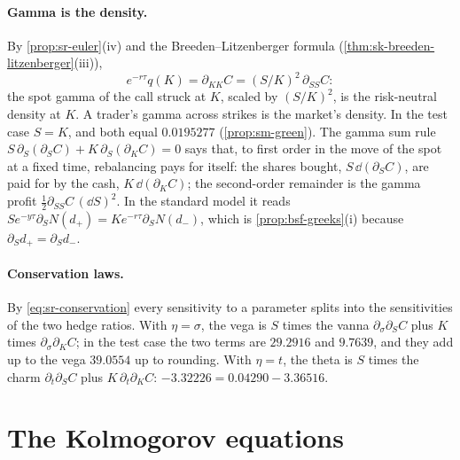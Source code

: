 \paragraph{Gamma is the density.} By \cref{prop:sr-euler}(iv) and the Breeden--Litzenberger formula
(\cref{thm:sk-breeden-litzenberger}(iii)),
\[
  e^{-r\tau}q(K)=\partial_{KK}C=(S/K)^2\,\partial_{SS}C :
\]
the spot gamma of the call struck at $K$, scaled by $(S/K)^2$, is the risk-neutral density at $K$. A trader's gamma across strikes is the market's density. In
the test case $S=K$, and both equal $0.0195277$ (\cref{prop:sm-green}). The gamma sum rule
$S\,\partial_S(\partial_SC)+K\,\partial_S(\partial_KC)=0$ says that, to first order in the move of the spot at a fixed time, rebalancing pays for itself: the shares
bought, $S\,\dd(\partial_SC)$, are paid for by the cash, $K\,\dd(\partial_KC)$; the second-order remainder is the
gamma profit $\frac12\partial_{SS}C\,(\dd S)^2$. In the standard model it
reads $Se^{-y\tau}\partial_SN(d_+)=Ke^{-r\tau}\partial_SN(d_-)$, which is \cref{prop:bsf-greeks}(i) because
$\partial_Sd_+=\partial_Sd_-$.

\paragraph{Conservation laws.} By \eqref{eq:sr-conservation} every sensitivity to a parameter splits into
the sensitivities of the two hedge ratios. With $\eta=\sigma$, the vega is $S$ times the vanna
$\partial_\sigma\partial_SC$ plus $K$ times $\partial_\sigma\partial_KC$; in the test case the two terms are $29.2916$ and
$9.7639$, and they add up to the vega $39.0554$ up to rounding. With
$\eta=t$, the theta is $S$ times the charm $\partial_t\partial_SC$ plus $K\,\partial_t\partial_KC$:
$-3.32226=0.04290-3.36516$.


\section{The Kolmogorov equations}\label{sec:sr-kolmogorov}

